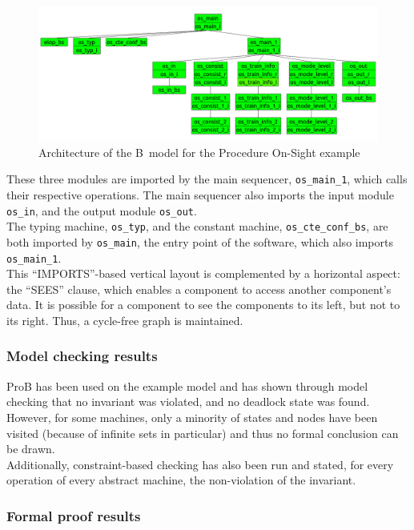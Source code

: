 \begin{figure}[h!]
\centering
\includegraphics[width=1\textwidth]{figures/procedureos}
\caption{Architecture of the B~model for the Procedure On-Sight example}
\label{fig:procos}
\end{figure}

These three modules are imported by the main sequencer, \verb+os_main_1+, which calls their respective operations. The main sequencer also imports the input module \verb+os_in+, and the output module \verb+os_out+.\\
The typing machine, \verb+os_typ+, and the constant machine, \verb+os_cte_conf_bs+, are both imported by \verb+os_main+, the entry point of the software, which also imports \verb+os_main_1+.\\
 
This ``IMPORTS''-based vertical layout is complemented by a horizontal aspect: the ``SEES'' clause, which enables a component to access another component's data. It is possible for a component to see the components to its left, but not to its right. Thus, a cycle-free graph is maintained.
 
\subsubsection{Model checking results}
\label{subapp:mc}
ProB has been used on the example model and has shown through model checking that no invariant was violated, and no deadlock state was found. However, for some machines, only a minority of states and nodes have been visited (because of infinite sets in particular) and thus no formal conclusion can be drawn.\\
Additionally, constraint-based checking has also been run and stated, for every operation of every abstract machine, the non-violation of the invariant.

\subsubsection{Formal proof results}
\label{subapp:proof}
